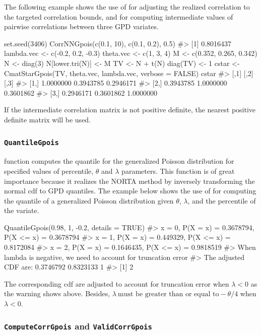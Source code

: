 The following example shows the use of  for adjusting the realized correlation to the targeted correlation bounds, and  for computing intermediate values of pairwise correlations between three GPD variates.

\begin{example}
set.seed(3406)
CorrNNGpois(c(0.1, 10), c(0.1, 0.2), 0.5)
#> [1] 0.8016437
lambda.vec <- c(-0.2, 0.2, -0.3)
theta.vec <- c(1, 3, 4)
M <- c(0.352, 0.265, 0.342)
N <- diag(3)
N[lower.tri(N)] <- M
TV <- N + t(N)
diag(TV) <- 1
cstar <- CmatStarGpois(TV, theta.vec, lambda.vec, verbose = FALSE)
cstar
#>           [,1]      [,2]      [,3]
#> [1,] 1.0000000 0.3943785 0.2946171
#> [2,] 0.3943785 1.0000000 0.3601862
#> [3,] 0.2946171 0.3601862 1.0000000
\end{example}

If the intermediate correlation matrix is not positive definite, the nearest positive definite matrix will be used.
 
\subsubsection{\texttt{QuantileGpois}}

\noindent {} function computes the quantile for the generalized Poisson distribution for specified values of percentile, $\theta$ and $\lambda$ parameters. This function is of great importance because it realizes the NORTA method \citep{chen2001initialization} by inversely transforming the normal cdf to GPD quantiles. The example below shows the use of  for computing the quantile of a generalized Poisson distribution given $\theta$, $\lambda$, and the percentile of the variate. 

\begin{example}
QuantileGpois(0.98, 1, -0.2, details = TRUE)
#> x = 0, P(X = x) = 0.3678794, P(X <= x) = 0.3678794
#> x = 1, P(X = x) = 0.449329, P(X <= x) = 0.8172084
#> x = 2, P(X = x) = 0.1646435, P(X <= x) = 0.9818519
#> When lambda is negative, we need to account for truncation error
#> The adjusted CDF are: 0.3746792 0.8323133 1
#> [1] 2
\end{example}

The corresponding cdf are adjusted to account for truncation error when $\lambda < 0$ as the warning shows above. Besides, $\lambda \ \text{must be greater than or equal to} -\theta/4$ when $\lambda < 0$. 

\subsubsection{\texttt{ComputeCorrGpois} and \texttt{ValidCorrGpois}}

